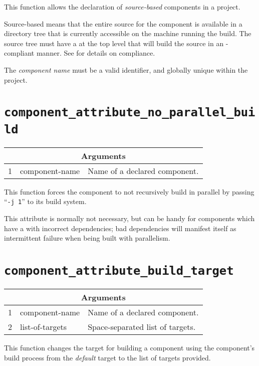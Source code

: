 This function allows the declaration of \emph{source-based} components
in a project.

Source-based means that the entire source for the component is
available in a directory tree that is currently accessible on the
machine running the build.  The source tree must have a \makefile at
the top level that will build the source in an \lmsbw-compliant
manner.  See  for details on \makefile
compliance.

The \emph{component name} must be a valid \make identifier, and
globally unique within the project.

\section{\texttt{component\_attribute\_no\_parallel\_build}}\label{api:component-attribute-no-parallel-build}

\begin{tabularx}{\linewidth}{ll|X}
  \multicolumn{3}{c}{\textbf{Arguments}} \\ \hline
  1 & component-name & Name of a declared component.
\end{tabularx}

This function forces the component to not recursively build in
parallel by passing ``\texttt{-j~1}'' to its build system.

This attribute is normally not necessary, but can be handy for
components which have a \makefile with incorrect dependencies; bad
dependencies will manifest itself as intermittent failure when being
built with parallelism.

\section{\texttt{component\_attribute\_build\_target}}\label{api:component-attribute-build-target}

\begin{tabularx}{\linewidth}{ll|X}
  \multicolumn{3}{c}{\textbf{Arguments}} \\ \hline
  1 & component-name & Name of a declared component. \\

  2 & list-of-targets & Space-separated list of targets.
\end{tabularx}

This function changes the target for building a component using the
component's build process from the \emph{default} \make target to the
list of targets provided.

